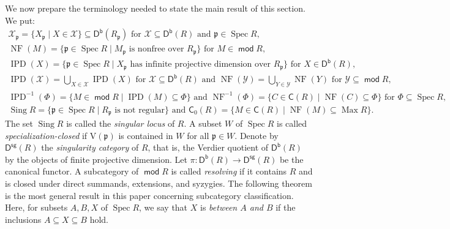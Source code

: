 \documentclass{amsart}
\theoremstyle{definition}
\theoremstyle{remark}
\numberwithin{equation}{thm}
\def\c{\mathsf{C}}
\def\Db{\operatorname{\mathsf{D^b}}}
\def\Dsg{\operatorname{\mathsf{D^{sg}}}}
\def\ipd{\operatorname{IPD}}
\def\Max{\operatorname{Max}}
\def\mod{\operatorname{\mathsf{mod}}}
\def\nf{\operatorname{NF}}
\def\p{\mathfrak{p}}
\def\sing{\operatorname{Sing}}
\def\spec{\operatorname{Spec}}
\def\V{\mathrm{V}}
\def\X{\mathcal{X}}
\def\Y{\mathcal{Y}}
\begin{document}
We now prepare the terminology needed to state the main result of this section. 
We put:
$$
\begin{array}{l}
\X_\p=\{X_\p\mid X\in\X\}\subseteq\Db(R_\p)\text{ for }\X\subseteq\Db(R)\text{ and }\p\in\spec R,\\
\nf(M)=\{\p\in\spec R\mid\text{$M_\p$ is nonfree over $R_\p$}\}\text{ for }M\in\mod R,\\
\ipd(X)=\{\p\in\spec R\mid\text{$X_\p$ has infinite projective dimension over $R_\p$}\}\text{ for }X\in\Db(R),\\
\ipd(\X)=\bigcup_{X\in\X}\ipd(X)\text{ for }\X\subseteq\Db(R)\text{ and }\nf(\Y)=\bigcup_{Y\in\Y}\nf(Y)\text{ for }\Y\subseteq\mod R,\\
\ipd^{-1}(\Phi)=\{M\in\mod R\mid\ipd(M)\subseteq\Phi\}\text{ and }\nf^{-1}(\Phi)=\{C\in\c(R)\mid\nf(C)\subseteq\Phi\}\text{ for }\Phi\subseteq\spec R,\\
\sing R=\{\p\in\spec R\mid\text{$R_\p$ is not regular\}}\text{ and }\c_0(R)=\{M\in\c(R)\mid\nf(M)\subseteq\Max R\}.
\end{array}
$$
The set $\sing R$ is called the \textit{singular locus} of $R$.
A subset $W$ of $\spec R$ is called \textit{specialization-closed} if $\V(\p)$ is contained in $W$ for all $\p\in W$.
Denote by $\Dsg(R)$ the {\em singularity category} of $R$, that is, the Verdier quotient of $\Db(R)$ by the objects of finite projective dimension.
Let $\pi:\Db(R)\to\Dsg(R)$ be the canonical functor. 
A subcategory of $\mod R$ is called {\em resolving} if it contains $R$ and is closed under direct summands, extensions, and syzygies.
The following theorem is the most general result in this paper concerning subcategory classification.
Here, for subsets $A,B,X$ of $\spec R$, we say that $X$ is {\em between $A$ and $B$} if the inclusions $A\subseteq X\subseteq B$ hold.
\end{document}
